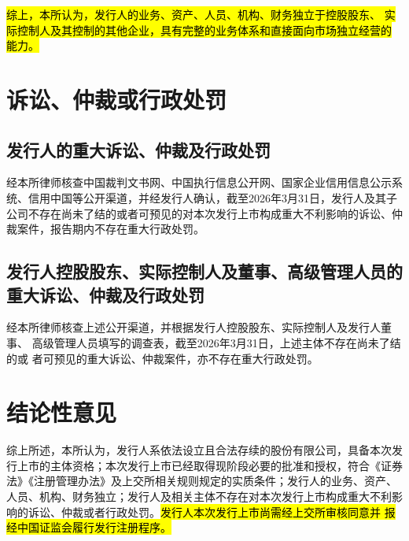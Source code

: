 \documentclass[zihao=-4]{ctexart}   %
\begin{document}
\hl{综上，本所认为，发行人的业务、资产、人员、机构、财务独立于控股股东、
实际控制人及其控制的其他企业，具有完整的业务体系和直接面向市场独立经营的
能力。}

\section{诉讼、仲裁或行政处罚}

\subsection{发行人的重大诉讼、仲裁及行政处罚}

经本所律师核查中国裁判文书网、中国执行信息公开网、国家企业信用信息公示系
统、信用中国等公开渠道，并经发行人确认，截至2026年3月31日，发行人及其子
公司不存在尚未了结的或者可预见的对本次发行上市构成重大不利影响的诉讼、仲
裁案件，报告期内不存在重大行政处罚。

\subsection{发行人控股股东、实际控制人及董事、高级管理人员的重大诉讼、仲裁及行政处罚}

经本所律师核查上述公开渠道，并根据发行人控股股东、实际控制人及发行人董事、
高级管理人员填写的调查表，截至2026年3月31日，上述主体不存在尚未了结的或
者可预见的重大诉讼、仲裁案件，亦不存在重大行政处罚。

\section{结论性意见}

综上所述，本所认为，发行人系依法设立且合法存续的股份有限公司，具备本次发
行上市的主体资格；本次发行上市已经取得现阶段必要的批准和授权，符合《证券
法》《注册管理办法》及上交所相关规则规定的实质条件；发行人的业务、资产、
人员、机构、财务独立；发行人及相关主体不存在对本次发行上市构成重大不利影
响的诉讼、仲裁或者行政处罚。\hl{发行人本次发行上市尚需经上交所审核同意并
报经中国证监会履行发行注册程序。}


\end{document}
